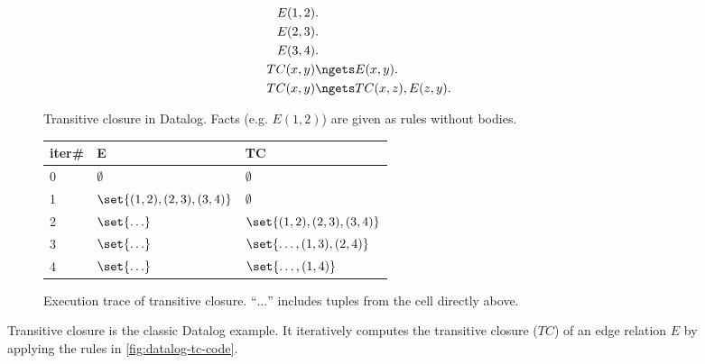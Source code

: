 \begin{figure}
\begin{subfigure}[b]{0.4\linewidth}
\begin{align*}
E(1, 2)&. \\
E(2, 3)&. \\
E(3, 4)&. \\
TC(x, y) & \ngets E(x, y). \\
TC(x, y) & \ngets TC(x, z), E(z, y).
\end{align*}
\caption{
  Transitive closure in Datalog.
  Facts (e.g. $E(1, 2)$) are given as rules without bodies.
}\label{fig:datalog-tc-code}
\end{subfigure}
\hfill
\begin{subfigure}[b]{0.55\linewidth}
\begin{tabular}{lll}
    iter\# & E & TC \\
    \hline 
    0 & $\emptyset$ & $\emptyset$ \\
    1 & $\set{(1,2),(2,3),(3,4)}$ & $\emptyset$ \\
    2 & $\set{\ldots}$ & $\set{(1,2),(2,3),(3,4)}$ \\
    3 & $\set{\ldots}$ & $\set{\ldots, (1,3),(2,4)}$ \\
    4 & $\set{\ldots}$ & $\set{\ldots, (1,4)}$ \\
\end{tabular}
\caption{
  Execution trace of transitive closure. 
  ``$\ldots$'' includes tuples from the cell directly above.
}
\label{fig:datalog-tc-exec}
\end{subfigure}
\caption{
  Transitive closure is the classic Datalog example.
  It iteratively computes the transitive closure ($TC$) 
  of an edge relation $E$
  by applying the rules in \autoref{fig:datalog-tc-code}.
}\label{fig:datalog-tc}
\end{figure}



